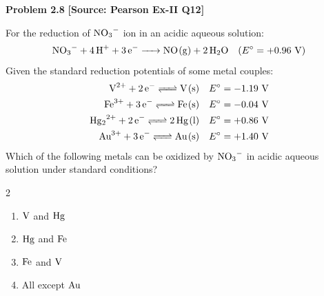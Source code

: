 \begin{problembox}
\textbf{Problem 2.8} \hfill \textbf{[Source: Pearson Ex-II Q12]}

For the reduction of $\ce{NO3-}$ ion in an acidic aqueous solution:
\begin{equation*}
    \ce{NO3- + 4H+ + 3e^- -> NO(g) + 2H2O} \quad (E^\circ = +0.96\text{ V})
\end{equation*}
Given the standard reduction potentials of some metal couples:
\begin{align*}
    \ce{V^2+ + 2e^- <=> V(s)} \quad & E^\circ = -1.19\text{ V} \\
    \ce{Fe^3+ + 3e^- <=> Fe(s)} \quad & E^\circ = -0.04\text{ V} \\
    \ce{Hg2^2+ + 2e^- <=> 2Hg(l)} \quad & E^\circ = +0.86\text{ V} \\
    \ce{Au^3+ + 3e^- <=> Au(s)} \quad & E^\circ = +1.40\text{ V}
\end{align*}
Which of the following metals can be oxidized by $\ce{NO3-}$ in acidic aqueous solution under standard conditions?
\begin{multicols}{2}
\begin{enumerate}[label=(\alph*)]
    \item $\ce{V}$ and $\ce{Hg}$
    \item $\ce{Hg}$ and $\ce{Fe}$
    \item $\ce{Fe}$ and $\ce{V}$
    \item All except $\ce{Au}$
\end{enumerate}
\end{multicols}
\end{problembox}

